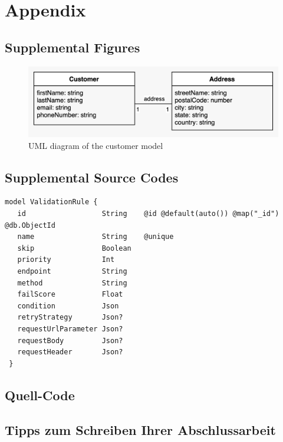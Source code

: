 \appendix
{}

\chapter{Appendix}


 \section{Supplemental Figures}

  \begin{figure}[!ht]
   \includegraphics[width=\textwidth]{diagrams/entity_customer.jpeg}
   \caption{UML diagram of the customer model}
   \label{fig:customer_uml}
  \end{figure}

 \section{Supplemental Source Codes}
 
  \begin{lstlisting}[caption={\emph{Prisma} schema of a validation rule (Prisma)}, label={code:prisma}]
 model ValidationRule {
   id                  String    @id @default(auto()) @map("_id") @db.ObjectId
   name                String    @unique
   skip                Boolean
   priority            Int
   endpoint            String
   method              String
   failScore           Float
   condition           Json
   retryStrategy       Json?
   requestUrlParameter Json?
   requestBody         Json?
   requestHeader       Json?
 }
  \end{lstlisting}

\section{Quell-Code}

\section{Tipps zum Schreiben Ihrer Abschlussarbeit}

